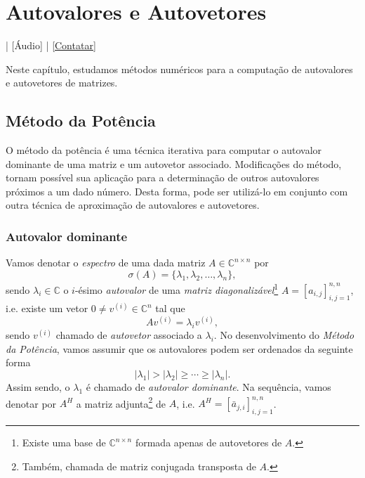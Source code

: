 

\chapter{Autovalores e Autovetores}\label{cap_autoval}
\thispagestyle{fancy}

\begin{flushright}
  [Vídeo] | [Áudio] | \href{https://phkonzen.github.io/notas/contato.html}{[Contatar]}
\end{flushright}

Neste capítulo, estudamos métodos numéricos para a computação de autovalores e autovetores de matrizes.

\section{Método da Potência}\label{cap_autoval_sec_pot}

O método da potência é uma técnica iterativa para computar o autovalor dominante de uma matriz e um autovetor associado. Modificações do método, tornam possível sua aplicação para a determinação de outros autovalores próximos a um dado número. Desta forma, pode ser utilizá-lo em conjunto com outra técnica de aproximação de autovalores e autovetores.

\subsection{Autovalor dominante}

Vamos denotar o \emph{espectro} de uma dada matriz $A\in\mathbb{C}^{n\times n}$ por
\begin{equation}
  \sigma(A) = \{\lambda_1, \lambda_2, \dotsc, \lambda_n\},
\end{equation}
sendo $\lambda_i\in \mathbb{C}$ o $i$-ésimo \emph{autovalor} de uma \emph{matriz diagonalizável}\footnote{Existe uma base de $\mathbb{C}^{n\times n}$ formada apenas de autovetores de $A$.} $A=[a_{i,j}]_{i,j=1}^{n,n}$, i.e. existe um vetor $0\neq v^{(i)}\in\mathbb{C}^n$ tal que
\begin{equation}
  Av^{(i)} = \lambda_i v^{(i)},
\end{equation}
sendo $v^{(i)}$ chamado de \emph{autovetor} associado a $\lambda_i$. No desenvolvimento do \emph{Método da Potência}, vamos assumir que os autovalores podem ser ordenados da seguinte forma
\begin{equation}
  |\lambda_1| > |\lambda_2| \geq \cdots \geq |\lambda_n|.
\end{equation}
Assim sendo, o $\lambda_1$ é chamado de \emph{autovalor dominante}. Na sequência, vamos denotar por $A^H$ a matriz adjunta\footnote{Também, chamada de matriz conjugada transposta de $A$.} de $A$, i.e. $A^H=[\bar{a}_{j,i}]_{i,j=1}^{n,n}$.

